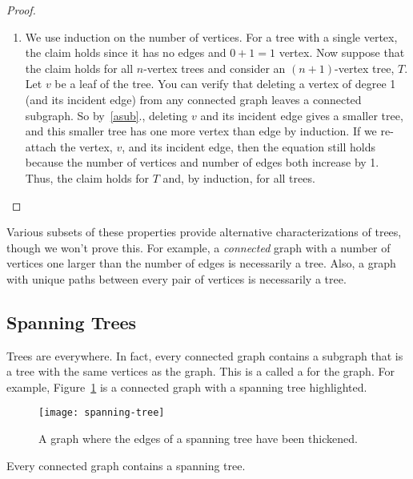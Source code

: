 \begin{proof}
\begin{enumerate}
\item We use induction on the number of vertices.  For a tree with a
  single vertex, the claim holds since it has no edges and $0 + 1 = 1$
  vertex.  Now suppose that the claim holds for all $n$-vertex trees
  and consider an $(n+1)$-vertex tree, $T$.  Let $v$ be a leaf of the
  tree.  You can verify that deleting a vertex of degree 1 (and its
  incident edge) from any connected graph leaves a connected subgraph.
  So by~\ref{asub}., deleting $v$ and its incident edge gives a
  smaller tree, and this smaller tree has one more vertex than edge by
  induction.  If we re-attach the vertex, $v$, and its incident edge,
  then the equation still holds because the number of vertices and
  number of edges both increase by 1.  Thus, the claim holds for $T$
  and, by induction, for all trees. \qedhere

\end{enumerate}

\end{proof}

Various subsets of these properties provide alternative characterizations
of trees, though we won't prove this.  For example, a \emph{connected}
graph with a number of vertices one larger than the number of edges is
necessarily a tree.  Also, a graph with unique paths between every pair of
vertices is necessarily a tree.

\subsection{Spanning Trees}

Trees are everywhere.  In fact, every connected graph contains a
subgraph that is a tree with the same vertices as the graph.  This is
a called a  for the graph.  For example,
Figure~\ref{fig:5LL} is a connected graph with a spanning tree
highlighted.

\begin{figure}

\texttt{[image: spanning-tree]}

\caption{A graph where the edges of a spanning tree have been
  thickened.}

\label{fig:5LL}

\end{figure}

\begin{theorem}
Every connected graph contains a spanning tree.
\end{theorem}

